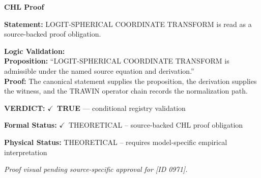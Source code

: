 \vspace{0.45em}
\noindent\textbf{CHL Proof}\par
\textbf{Statement:} LOGIT-SPHERICAL COORDINATE TRANSFORM is read as a source-backed proof obligation.

\textbf{Logic Validation:}\\
\textbf{Proposition:} ``LOGIT-SPHERICAL COORDINATE TRANSFORM is admissible under the named source equation and derivation.''\\
\textbf{Proof:} The canonical statement supplies the proposition, the derivation supplies the witness, and the TRAWIN operator chain records the normalization path.

\textbf{VERDICT:} \ensuremath{\checkmark}\ \textbf{TRUE} --- conditional registry validation

\textbf{Formal Status:} \ensuremath{\checkmark}\ THEORETICAL -- source-backed CHL proof obligation

\textbf{Physical Status:} THEORETICAL -- requires model-specific empirical interpretation
\par\vspace{0.45em}
\par
\vfill
\begingroup\footnotesize\itshape
Proof visual pending source-specific approval for [ID 0971].
\par\endgroup
\vfill
\endgroup
\endgroup

